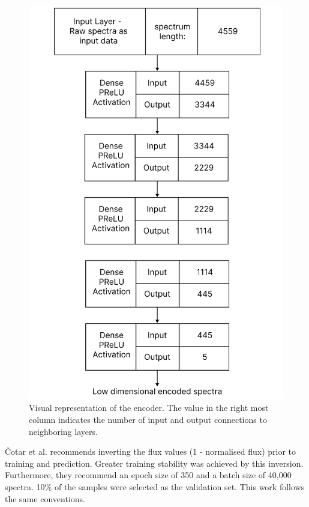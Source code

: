 \begin{figure}[!htb]
\centering
\includegraphics[scale=0.15]{figures/autoencoder diagram.png}
\caption{Visual representation of the encoder. The value in
the right most column indicates the number of input and output
connections to neighboring layers.}
\end{figure}

Čotar et al. recommends inverting the flux values (1 - normalised flux) prior to training and prediction. Greater training stability was achieved by this inversion. Furthermore, they recommend an epoch size of 350 and a batch size of 40,000 spectra. 10\% of the samples were selected as the validation set. This work follows the same conventions. 

